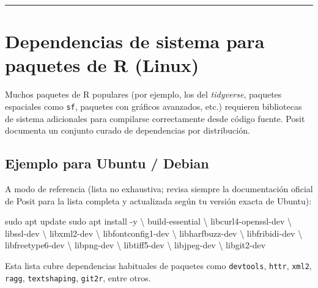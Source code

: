 \documentclass[
  man,
  floatsintext,
  longtable,
  a4paper,
  nolmodern,
  notxfonts,
  notimes,
  12pt,
  colorlinks=true,linkcolor=blue,citecolor=blue,urlcolor=blue]{apa7}
\newenvironment{Shaded}{\begin{snugshade}}{\end{snugshade}}
\newcommand{\AttributeTok}[1]{\textcolor[rgb]{0.40,0.45,0.13}{#1}}
\newcommand{\DataTypeTok}[1]{\textcolor[rgb]{0.68,0.00,0.00}{#1}}
\newcommand{\FunctionTok}[1]{\textcolor[rgb]{0.28,0.35,0.67}{#1}}
\newcommand{\NormalTok}[1]{\textcolor[rgb]{0.00,0.23,0.31}{#1}}
\begin{document}
\begin{center}\rule{0.5\linewidth}{0.5pt}\end{center}

\section{Dependencias de sistema para paquetes de R
(Linux)}\label{dependencias-de-sistema-para-paquetes-de-r-linux}

Muchos paquetes de R populares (por ejemplo, los del \emph{tidyverse},
paquetes espaciales como \texttt{sf}, paquetes con gráficos avanzados,
etc.) requieren bibliotecas de sistema adicionales para compilarse
correctamente desde código fuente. Posit documenta un conjunto curado de
dependencias por distribución.

\subsection{Ejemplo para Ubuntu /
Debian}\label{ejemplo-para-ubuntu-debian}

A modo de referencia (lista no exhaustiva; revisa siempre la
documentación oficial de Posit para la lista completa y actualizada
según tu versión exacta de Ubuntu):

\begin{Shaded}
\begin{Highlighting}[]
\FunctionTok{sudo}\NormalTok{ apt update}
\FunctionTok{sudo}\NormalTok{ apt install }\AttributeTok{{-}y} \DataTypeTok{\textbackslash{}}
\NormalTok{  build{-}essential }\DataTypeTok{\textbackslash{}}
\NormalTok{  libcurl4{-}openssl{-}dev }\DataTypeTok{\textbackslash{}}
\NormalTok{  libssl{-}dev }\DataTypeTok{\textbackslash{}}
\NormalTok{  libxml2{-}dev }\DataTypeTok{\textbackslash{}}
\NormalTok{  libfontconfig1{-}dev }\DataTypeTok{\textbackslash{}}
\NormalTok{  libharfbuzz{-}dev }\DataTypeTok{\textbackslash{}}
\NormalTok{  libfribidi{-}dev }\DataTypeTok{\textbackslash{}}
\NormalTok{  libfreetype6{-}dev }\DataTypeTok{\textbackslash{}}
\NormalTok{  libpng{-}dev }\DataTypeTok{\textbackslash{}}
\NormalTok{  libtiff5{-}dev }\DataTypeTok{\textbackslash{}}
\NormalTok{  libjpeg{-}dev }\DataTypeTok{\textbackslash{}}
\NormalTok{  libgit2{-}dev}
\end{Highlighting}
\end{Shaded}

Esta lista cubre dependencias habituales de paquetes como
\texttt{devtools}, \texttt{httr}, \texttt{xml2}, \texttt{ragg},
\texttt{textshaping}, \texttt{git2r}, entre otros.
\end{document}
